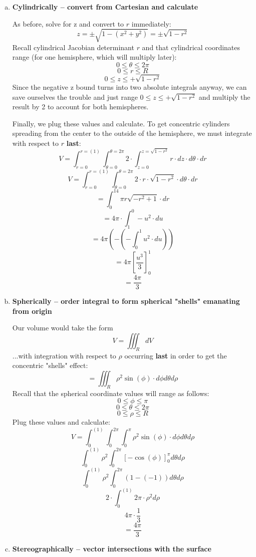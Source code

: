 \documentclass{article}
\begin{document}
\begin{enumerate}[a.]
    \item \textbf{Cylindrically -- convert from Cartesian and calculate}

          As before, solve for z and convert to $r$ immediately:
          \[ z=\pm\sqrt{1-(x^2+y^2)} = \pm\sqrt{1-r^2}\]
          Recall cylindrical Jacobian determinant $ r $ and that cylindrical coordinates range (for one hemisphere, which will multiply later):
          \[0 \leq \theta \leq 2\pi \]
          \[0 \leq r \leq R \]
          \[0 \leq z \leq +\sqrt{1-r^2}\]
          Since the negative z bound turns into two absolute integrals anyway, we can save ourselves the trouble and just range $0 \leq z \leq +\sqrt{1-r^2}$ and multiply the result by 2 to account for both hemispheres.

          Finally, we plug these values and calculate. To get concentric cylinders spreading from the center to the outside of the hemisphere, we must integrate with respect to $r$ \textbf{last}:
          \[ V = \int_{r = 0}^{r = (1)} \int_{\theta = 0}^{\theta = 2\pi} 2\cdot\int_{z = 0}^{z = \sqrt{1-r^2}} r \cdot dz \cdot d\theta \cdot dr \]
          \[ V = \int_{r = 0}^{r = (1)} \int_{\theta = 0}^{\theta = 2\pi} 2\cdot r \cdot \sqrt{1-r^2} \cdot d\theta \cdot dr \]
          \[=\int _0^14\pi r\sqrt{-r^2+1} \cdot dr\]
          \[=4\pi \cdot \int _1^0-u^2 \cdot du\]
          \[=4\pi \left(-\left(-\int _0^1u^2 \cdot du\right)\right)\]
          \[=4\pi \left[\frac{u^3}{3}\right]^1_0\]
          \[=\frac{4\pi }{3} \]

    \item \textbf{Spherically -- order integral to form spherical "shells" emanating from origin}

          Our volume would take the form
          \[ V = \iiint_{R}dV \]
          ...with integration with respect to $\rho$ occurring \textbf{last} in order to get the concentric "shells" effect:
          \[ = \iiint_{R}\rho^2\sin(\phi) \cdot d\phi d\theta d\rho \]
          Recall that the spherical coordinate values will range as follows:
          \[ 0 \leq \phi \leq \pi  \]
          \[ 0 \leq \theta \leq 2\pi  \]
          \[ 0 \leq \rho \leq R \]
          Plug these values and calculate:
          \[ V = \int_{0}^{(1)}\int_{0}^{2\pi}\int_{0}^{\pi}\rho^2\sin(\phi) \cdot d\phi d\theta d\rho \]
          \[ \int_{0}^{(1)}\rho^2\int_{0}^{2\pi} \left[-\cos \left(\phi\right)\right]_0^{\pi } d\theta d\rho \]
          \[ \int_{0}^{(1)}\rho^2\int_{0}^{2\pi} (1-\left(-1\right)) d\theta d\rho \]
          \[ 2 \cdot \int_{0}^{(1)} 2\pi \cdot \rho^2 d\rho \]
          \[ 4\pi \cdot \frac{1}{3} \]
          \[ = \frac{4\pi}{3} \]

    \item \textbf{Stereographically -- vector intersections with the surface}
\end{enumerate}
\end{document}
